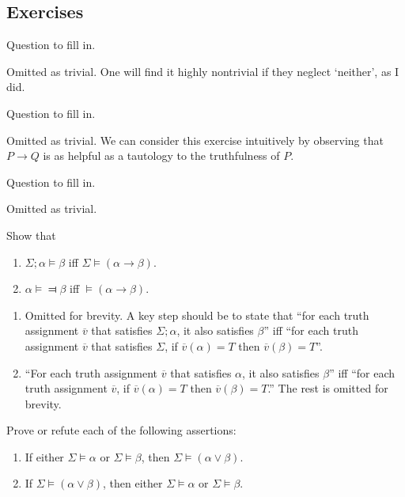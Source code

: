 \subsection*{Exercises}

\begin{exercise}
  Question to fill in.
\end{exercise}

Omitted as trivial. One will find it highly nontrivial if they neglect `neither', as I did.

\begin{exercise}
  Question to fill in.
\end{exercise}

Omitted as trivial. We can consider this exercise intuitively by observing that $P \rightarrow Q$ is as helpful as a tautology to the truthfulness of $P$.

\begin{exercise}
  Question to fill in.
\end{exercise}

Omitted as trivial.

\begin{exercise}
  Show that \begin{enumerate}[label=(\alph*)]
    \item $\Sigma;\alpha\vDash \beta$ iff $\Sigma\vDash(\alpha\rightarrow \beta)$.
    \item $\alpha\vDash\Dashv \beta$ iff $\vDash(\alpha\rightarrow \beta)$.\qedhere
  \end{enumerate}
\end{exercise}

\begin{enumerate}[label=(\alph*)]
  \item Omitted for brevity. A key step should be to state that ``for each truth assignment $\overline{v}$ that satisfies $\Sigma;\alpha$, it also satisfies $\beta$'' iff ``for each truth assignment $\overline{v}$ that satisfies $\Sigma$, if $\overline{v}(\alpha)=T$ then $\overline{v}(\beta)=T$''.
  \item ``For each truth assignment $\overline{v}$ that satisfies $\alpha$, it also satisfies $\beta$'' iff ``for each truth assignment $\overline{v}$, if $\overline{v}(\alpha)=T$ then $\overline{v}(\beta)=T$.'' The rest is omitted for brevity.
\end{enumerate}

\begin{exercise}
  Prove or refute each of the following assertions:
  \begin{enumerate}[label=(\alph*)]
    \item If either $\Sigma \vDash \alpha$ or $\Sigma \vDash \beta$, then $\Sigma \vDash (\alpha \lor \beta)$.
    \item If $\Sigma \vDash (\alpha \lor \beta)$, then either $\Sigma \vDash \alpha$ or $\Sigma \vDash \beta$.\qedhere
  \end{enumerate}
\end{exercise}

